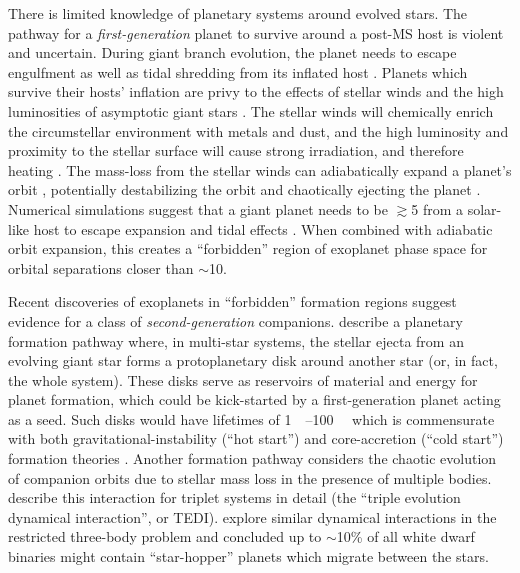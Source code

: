 \documentclass[twocolumn,linenumbers]{aastex631}
\begin{document}
There is limited knowledge of planetary systems around evolved stars. The pathway for a \textit{first-generation} planet to survive around a post-MS host is violent and uncertain. During giant branch evolution, the planet needs to escape engulfment as well as tidal shredding from its inflated host \citep{burleighImagingPlanetsNearby2002a,nordhausOrbitsLowmassCompanions2013}. Planets which survive their hosts' inflation are privy to the effects of stellar winds and the high luminosities of asymptotic giant stars \citep{mustillForetellingsRagnarokWorldengulfing2012,mustillMainsequenceProgenitorConfigurations2013,verasPostmainsequencePlanetarySystem2016}. The stellar winds will chemically enrich the circumstellar environment with metals and dust, and the high luminosity and proximity to the stellar surface will cause strong irradiation, and therefore heating \citep{spiegelJupiterWillBecome2012}. The mass-loss from the stellar winds can adiabatically expand a planet's orbit \citep{jeansCosmogonicProblemsAssociated1924}, potentially destabilizing the orbit and chaotically ejecting the planet \citep{kratterStarHoppersPlanet2012}. Numerical simulations suggest that a giant planet needs to be $\gtrsim$\qty{5}{\au} from a solar-like host to escape expansion and tidal effects \citep{spiegelJupiterWillBecome2012,nordhausOrbitsLowmassCompanions2013}. When combined with adiabatic orbit expansion, this creates a ``forbidden'' region of exoplanet phase space for orbital separations closer than $\sim$\qty{10}{\au}.

Recent discoveries of exoplanets in ``forbidden'' formation regions \citep{vanderburgGiantPlanetCandidate2020,blackmanJovianAnalogueOrbiting2021} suggest evidence for a class of \textit{second-generation} companions. \citet{peretsSecondGenerationPlanets2010,peretsPlanetsEvolvedBinary2011} describe a planetary formation pathway where, in multi-star systems, the stellar ejecta from an evolving giant star forms a protoplanetary disk around another star (or, in fact, the whole system). These disks serve as reservoirs of material and energy for planet formation, which could be kick-started by a first-generation planet acting as a seed. Such disks would have lifetimes of \qtyrange{1}{100}{\mega\year} which is commensurate with both gravitational-instability (``hot start'') and core-accretion (``cold start'') formation theories \citep{marleyLuminosityYoungJupiters2007,spiegelSpectralPhotometricDiagnostics2012a}. Another formation pathway considers the chaotic evolution of companion orbits due to stellar mass loss in the presence of multiple bodies. \citet{peretsTripleEvolutionDynamical2012} describe this interaction for triplet systems in detail (the ``triple evolution dynamical interaction'', or TEDI). \citet{kratterStarHoppersPlanet2012} explore similar dynamical interactions in the restricted three-body problem and concluded up to $\sim$10\% of all white dwarf binaries might contain ``star-hopper'' planets which migrate between the stars.
\end{document}
